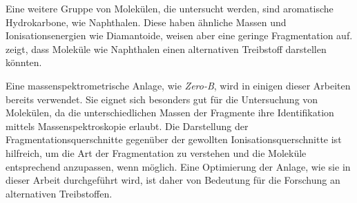 Eine weitere Gruppe von Molekülen, die untersucht werden, sind aromatische Hydrokarbone, wie Naphthalen. Diese haben ähnliche Massen und Ionisationsenergien wie Diamantoide, weisen aber eine geringe Fragmentation auf. \cite{hydrocarbons} zeigt, dass Moleküle wie Naphthalen einen alternativen Treibstoff darstellen könnten.

Eine massenspektrometrische Anlage, wie \textit{Zero-B}, wird in einigen dieser Arbeiten bereits verwendet. Sie eignet sich besonders gut für die Untersuchung von Molekülen, da die unterschiedlichen Massen der Fragmente ihre Identifikation mittels Massenspektroskopie erlaubt. Die Darstellung der Fragmentationsquerschnitte gegenüber der gewollten Ionisationsquerschnitte ist hilfreich, um die Art der Fragmentation zu verstehen und die Moleküle entsprechend anzupassen, wenn möglich. Eine Optimierung der Anlage, wie sie in dieser Arbeit durchgeführt wird, ist daher von Bedeutung für die Forschung an alternativen Treibstoffen.

